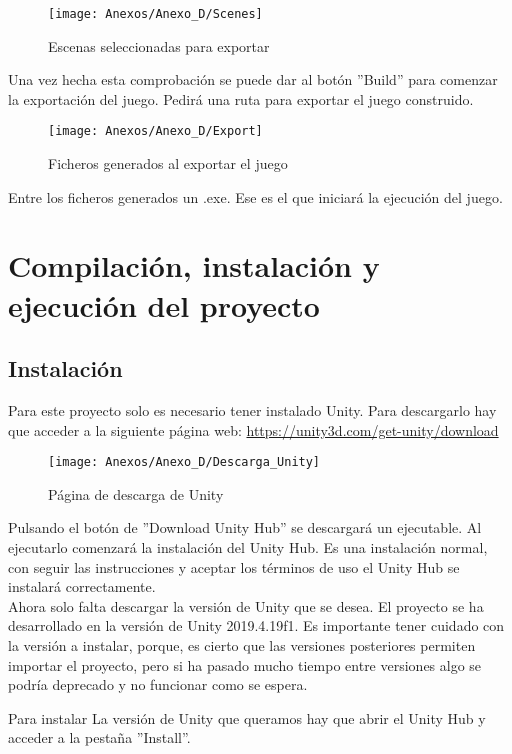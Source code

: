 \begin{figure}[h]
\centering
\texttt{[image: Anexos/Anexo\_D/Scenes]}
\caption{Escenas seleccionadas para exportar}
\end{figure}

Una vez hecha esta comprobación se puede dar al botón ''Build'' para comenzar la exportación del juego. Pedirá una ruta para exportar el juego construido.

\begin{figure}[h]
\centering
\texttt{[image: Anexos/Anexo\_D/Export]}
\caption{Ficheros generados al exportar el juego}
\end{figure}

Entre los ficheros generados un .exe. Ese es el que iniciará la ejecución del juego.

\section{Compilación, instalación y ejecución del proyecto}

\subsection{Instalación}
Para este proyecto solo es necesario tener instalado Unity. Para descargarlo hay que acceder a la siguiente página web: \url{https://unity3d.com/get-unity/download}

\begin{figure}[h]
\centering
\texttt{[image: Anexos/Anexo\_D/Descarga\_Unity]}
\caption{Página de descarga de Unity}
\end{figure}

Pulsando el botón de ''Download Unity Hub'' se descargará un ejecutable. Al ejecutarlo comenzará la instalación del Unity Hub. Es una instalación normal, con seguir las instrucciones y aceptar los términos de uso el Unity Hub se instalará correctamente.\\
Ahora solo falta descargar la versión de Unity que se desea. El proyecto se ha desarrollado en la versión de Unity 2019.4.19f1. Es importante tener cuidado con la versión a instalar, porque, es cierto que las versiones posteriores permiten importar el proyecto, pero si ha pasado mucho tiempo entre versiones algo se podría deprecado y no funcionar como se espera.

Para instalar La versión de Unity que queramos hay que abrir el Unity Hub y acceder a la pestaña ''Install''.

